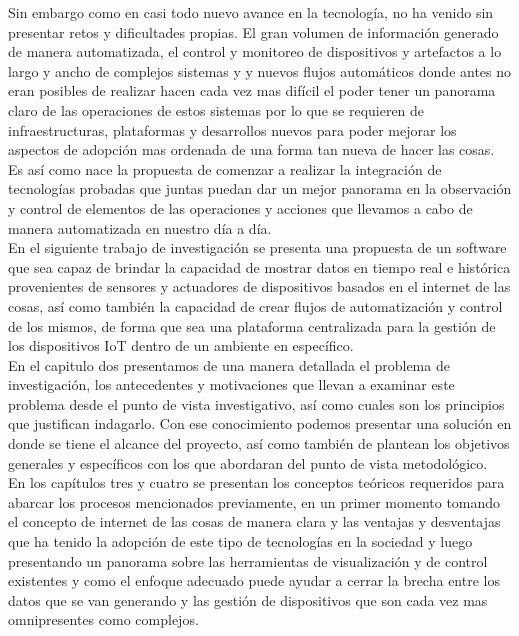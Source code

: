 Sin embargo como en casi todo nuevo avance en la tecnología, no ha venido sin presentar retos y dificultades propias. El gran volumen de información generado de manera automatizada, el control y monitoreo de dispositivos y artefactos a lo largo y ancho de complejos sistemas y y nuevos flujos automáticos donde antes no eran posibles de realizar hacen cada vez mas difícil el poder tener un panorama claro de las operaciones de estos sistemas por lo que se requieren de infraestructuras, plataformas y desarrollos nuevos para poder mejorar los aspectos de adopción mas ordenada de una forma tan nueva de hacer las cosas. Es así como nace la propuesta de comenzar a realizar la integración de tecnologías probadas que juntas puedan dar un mejor panorama en la observación y control de elementos de las operaciones y acciones que llevamos a cabo de manera automatizada en nuestro día a día.\\

En el siguiente trabajo de investigación se presenta una propuesta de un software que sea capaz de brindar la capacidad de mostrar datos en tiempo real e histórica provenientes de sensores y actuadores de dispositivos basados en el internet de las cosas, así como también la capacidad de crear flujos de automatización y control de los mismos, de forma que sea una plataforma centralizada para la gestión de los dispositivos IoT dentro de un ambiente en específico.\\

En el capitulo dos presentamos de una manera detallada el problema de investigación, los antecedentes y motivaciones que llevan a examinar este problema desde el punto de vista investigativo, así como cuales son los principios que justifican indagarlo. Con ese conocimiento podemos presentar una solución en donde se tiene el alcance del proyecto, así como también de plantean los objetivos generales y específicos con los que abordaran del punto de vista metodológico.\\

En los capítulos tres y cuatro se presentan los conceptos teóricos requeridos para abarcar los procesos mencionados previamente, en un primer momento tomando el concepto de internet de las cosas de manera clara y las ventajas y desventajas que ha tenido la adopción de este tipo de tecnologías en la sociedad y luego presentando un panorama sobre las herramientas de visualización y de control existentes y como el enfoque adecuado puede ayudar a cerrar la brecha entre los datos que se van generando y las gestión de dispositivos que son cada vez mas omnipresentes como complejos.\\

